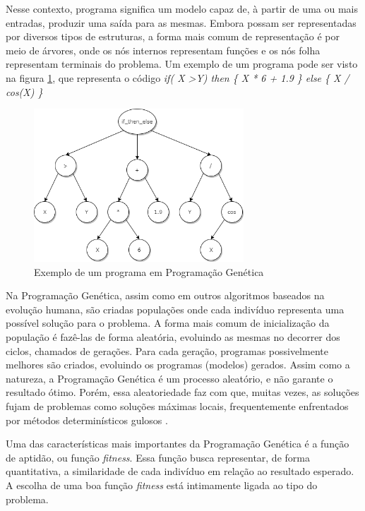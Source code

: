 \documentclass[12pt]{article}
\begin{document}
Nesse contexto, programa significa um modelo capaz de, à partir de uma ou mais entradas, produzir uma saída para as mesmas. Embora possam ser representadas por diversos tipos de estruturas, a forma mais comum de representação é por meio de árvores, onde os nós internos representam funções e os nós folha representam terminais do problema. Um exemplo de um programa pode ser visto na figura \ref{treeProgram}, que representa o código \emph{if( X \textgreater Y) then \{ X * 6 +  1.9 \} else \{ X / cos(X) \}}

\begin{figure}[!htb]
	\centering
	\includegraphics[width=0.7\textwidth]{treeGP}
	\caption{Exemplo de um programa em Programação Genética}
	\label{treeProgram}
\end{figure}

Na Programação Genética, assim como em outros algoritmos baseados na evolução humana, são criadas populações onde cada indivíduo representa uma possível solução para o problema. A forma mais comum de inicialização da população é fazê-las de forma aleatória, evoluindo as mesmas no decorrer dos ciclos, chamados de gerações. Para cada geração, programas possivelmente melhores são criados, evoluindo os programas (modelos) gerados. Assim como a natureza, a Programação Genética é um processo aleatório, e não garante o resultado ótimo. Porém, essa aleatoriedade faz com que, muitas vezes, as soluções fujam de problemas como soluções máximas locais, frequentemente enfrentados por métodos determinísticos gulosos \cite{mcphee2008field}.

Uma das características mais importantes da Programação Genética é a função de aptidão, ou função \emph{fitness}. Essa função busca representar, de forma quantitativa, a similaridade de cada indivíduo em relação ao resultado esperado. A escolha de uma boa função \emph{fitness} está intimamente ligada ao tipo do problema.
\end{document}
